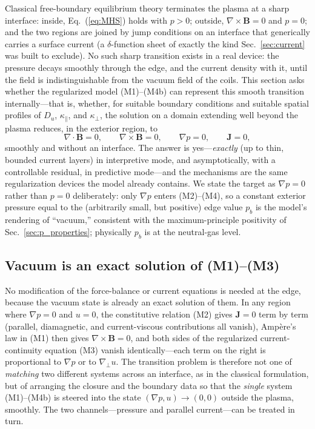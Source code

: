 \documentclass[english]{article}
\newcommand{\bB}{\mathbf{B}}
\newcommand{\bJ}{\mathbf{J}}
\newcommand{\gradperp}{\nabla_{\!\perp}}
\begin{document}
Classical free-boundary equilibrium theory terminates the plasma at a sharp interface: inside,
Eq.~(\ref{eq:MHS}) holds with $p>0$; outside, $\nabla\times\bB=0$ and $p=0$; and the two regions
are joined by jump conditions on an interface that generically carries a surface current (a
$\delta$-function sheet of exactly the kind Sec.~\ref{sec:current} was built to exclude). No such
sharp transition exists in a real device: the pressure decays smoothly through the edge, and the
current density with it, until the field is indistinguishable from the vacuum field of the coils.
This section asks whether the regularized model (M1)--(M4b) can represent this smooth transition
internally---that is, whether, for suitable boundary conditions and suitable spatial profiles of
$D_u$, $\kappa_\parallel$, and $\kappa_\perp$, the solution on a domain extending well beyond the
plasma reduces, in the exterior region, to
\begin{equation}
\nabla\cdot\bB=0,\qquad \nabla\times\bB=0,\qquad \nabla p=0,\qquad \bJ=0 ,
\label{eq:vacuum_target}
\end{equation}
smoothly and without an interface. The answer is yes---\emph{exactly} (up to thin, bounded current
layers) in interpretive mode, and asymptotically, with a controllable residual, in predictive
mode---and the mechanisms are the same regularization devices the model already contains. We state
the target as $\nabla p=0$ rather than $p=0$ deliberately: only $\nabla p$ enters
(M2)--(M4), so a constant exterior pressure equal to the (arbitrarily small, but positive) edge
value $p_b$ is the model's rendering of ``vacuum,'' consistent with the maximum-principle
positivity of Sec.~\ref{sec:p_properties}; physically $p_b$ is at the neutral-gas level.

\subsection{Vacuum is an exact solution of (M1)--(M3)}
\label{sec:vacuum_exact}

No modification of the force-balance or current equations is needed at the edge, because the
vacuum state is already an exact solution of them. In any region where $\nabla p=0$ and $u=0$,
the constitutive relation (M2) gives $\bJ=0$ term by term (parallel, diamagnetic, and
current-viscous contributions all vanish), Amp\`ere's law in (M1) then gives $\nabla\times\bB=0$,
and both sides of the regularized current-continuity equation (M3) vanish identically---each term
on the right is proportional to $\nabla p$ or to $\gradperp u$. The transition problem is
therefore not one of \emph{matching} two different systems across an interface, as in the
classical formulation, but of arranging the closure and the boundary data so that the
\emph{single} system (M1)--(M4b) is steered into the state $(\nabla p,u)\rightarrow(0,0)$ outside
the plasma, smoothly. The two channels---pressure and parallel current---can be treated in turn.
\end{document}
